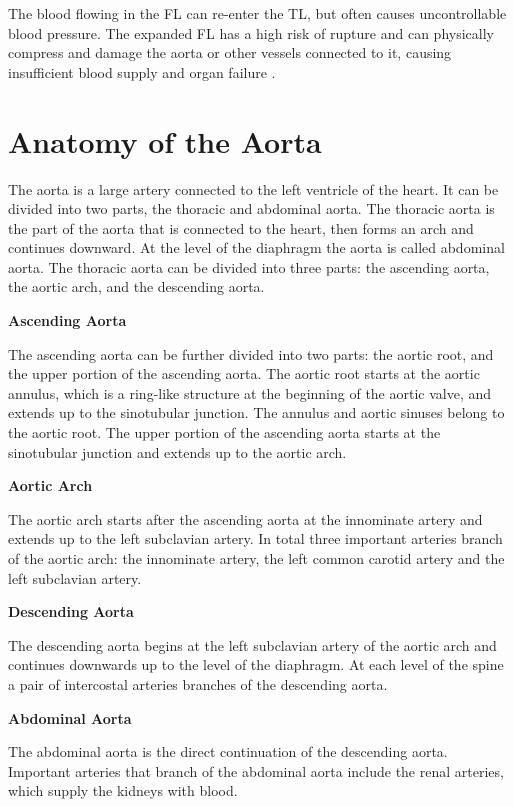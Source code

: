 \documentclass[thesis.tex]{subfiles}
\begin{document}
The blood flowing in the FL can re-enter the TL, but often causes uncontrollable blood pressure. The expanded FL has a high risk of rupture and can physically compress \cite{criado2011aortic} and damage the aorta or other vessels connected to it, causing insufficient blood supply and organ failure \cite{meszaros2000epidemiology,desanctis1987aortic}. 

\section{Anatomy of the Aorta}

The aorta is a large artery connected to the left ventricle of the heart. It can be divided into two parts, the thoracic and abdominal aorta. The thoracic aorta is the part of the aorta that is connected to the heart, then forms an arch and continues downward. At the level of the diaphragm the aorta is called abdominal aorta. The thoracic aorta can be divided into three parts: the ascending aorta, the aortic arch, and the descending aorta.

\textbf{Ascending Aorta}

The ascending aorta can be further divided into two parts: the aortic root, and the upper portion of the ascending aorta. 
The aortic root starts at the aortic annulus, which is a ring-like structure at the beginning of the aortic valve, and extends up to the sinotubular junction. The annulus and aortic sinuses belong to the aortic root. The upper portion of the ascending aorta starts at the sinotubular junction and extends up to the aortic arch.

\textbf{Aortic Arch}

The aortic arch starts after the ascending aorta at the innominate artery and extends up to the left subclavian artery. In total three important arteries branch of the aortic arch: the innominate artery, the left common carotid artery and the left subclavian artery. 

\textbf{Descending Aorta}

The descending aorta begins at the  left subclavian artery of the aortic arch and continues downwards up to the level of the diaphragm. At each level of the spine a pair of intercostal arteries branches of the descending aorta.

\textbf{Abdominal Aorta}

The abdominal aorta is the direct continuation of the descending aorta. Important arteries that branch of the abdominal aorta include the renal arteries, which supply the kidneys with blood.  
\end{document}
